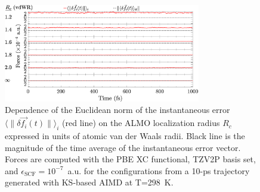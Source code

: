 \documentclass[aps,prl,reprint,amsmath,amssymb]{revtex4-1}
\begin{document}
\begin{figure}[t]
\includegraphics[trim={0cm 0cm 0.1cm 0.1cm},clip,width=8.6cm]{DeltaForceComparison_ALMO_SCF.eps}
\caption{\label{fig:forcecomp} Dependence of the Euclidean norm of the instantaneous error $\langle \| \delta \vec{f_{i}}(t) \| \rangle_{i}$ (red line) on the ALMO localization radius $R_c$ expressed in units of atomic van der Waals radii. Black line is the magnitude of the time average of the instantaneous error vector. %
Forces are computed with the PBE XC functional, TZV2P basis set, and $\epsilon_{\text{SCF}} = 10^{-7}$~a.u. for the configurations from a 10-ps trajectory generated with KS-based AIMD at T=298~K.}
\end{figure}

\end{document}
